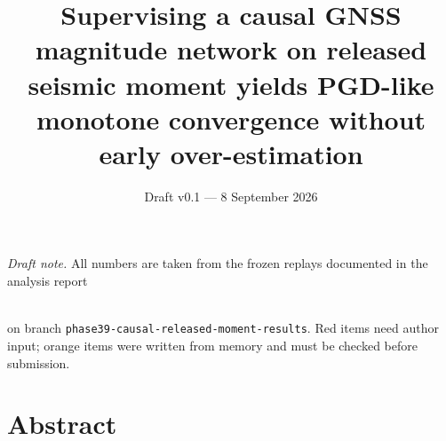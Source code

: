 \documentclass[12pt,letterpaper]{article}
\title{Supervising a causal GNSS magnitude network on released seismic moment yields PGD-like monotone convergence without early over-estimation}
\author{\todo{authors, affiliations, ORCIDs, corresponding author}}
\date{Draft v0.1 --- 8 September 2026}
\begin{document}
\maketitle

\noindent\small\textit{Draft note.} All numbers are taken from the frozen replays documented in the analysis report\\
\centerline{}\\
on branch \texttt{phase39-causal-released-moment-results}. Red items need author input; orange items were written from memory and must be checked before submission.
\normalsize

\section*{Abstract}
\end{document}
